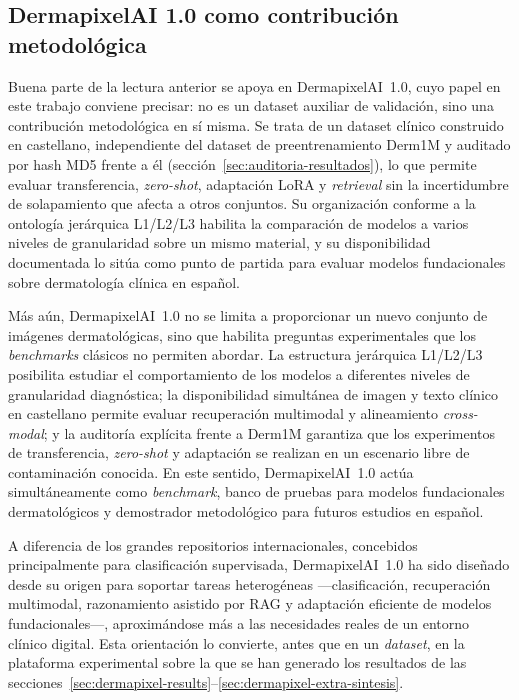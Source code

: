 \subsection{DermapixelAI 1.0 como contribución metodológica}
\label{sec:disc-dermapixel-contrib}

Buena parte de la lectura anterior se apoya en DermapixelAI~1.0, cuyo
papel en este trabajo conviene precisar: no es un dataset auxiliar de
validación, sino una contribución metodológica en sí misma. Se trata de
un dataset clínico construido en castellano, independiente del dataset de
preentrenamiento Derm1M y auditado por hash MD5 frente a él
(sección~\ref{sec:auditoria-resultados}), lo que permite evaluar
transferencia, \emph{zero-shot}, adaptación LoRA y \emph{retrieval} sin la
incertidumbre de solapamiento que afecta a otros conjuntos. Su
organización conforme a la ontología jerárquica L1/L2/L3 habilita la
comparación de modelos a varios niveles de granularidad sobre un mismo
material, y su disponibilidad documentada lo sitúa como punto de partida
para evaluar modelos fundacionales sobre dermatología clínica en español.

Más aún, DermapixelAI~1.0 no se limita a proporcionar un nuevo conjunto
de imágenes dermatológicas, sino que habilita preguntas experimentales
que los \emph{benchmarks} clásicos no permiten abordar. La estructura
jerárquica L1/L2/L3 posibilita estudiar el comportamiento de los modelos
a diferentes niveles de granularidad diagnóstica; la disponibilidad
simultánea de imagen y texto clínico en castellano permite evaluar
recuperación multimodal y alineamiento \emph{cross-modal}; y la auditoría
explícita frente a Derm1M garantiza que los experimentos de
transferencia, \emph{zero-shot} y adaptación se realizan en un escenario
libre de contaminación conocida. En este sentido, DermapixelAI~1.0 actúa
simultáneamente como \emph{benchmark}, banco de pruebas para modelos
fundacionales dermatológicos y demostrador metodológico para futuros
estudios en español.

A diferencia de los grandes repositorios internacionales, concebidos
principalmente para clasificación supervisada, DermapixelAI~1.0 ha sido
diseñado desde su origen para soportar tareas heterogéneas
---clasificación, recuperación multimodal, razonamiento asistido por RAG
y adaptación eficiente de modelos fundacionales---, aproximándose más a
las necesidades reales de un entorno clínico digital. Esta orientación lo
convierte, antes que en un \emph{dataset}, en la plataforma experimental
sobre la que se han generado los resultados de las
secciones~\ref{sec:dermapixel-results}--\ref{sec:dermapixel-extra-sintesis}.

